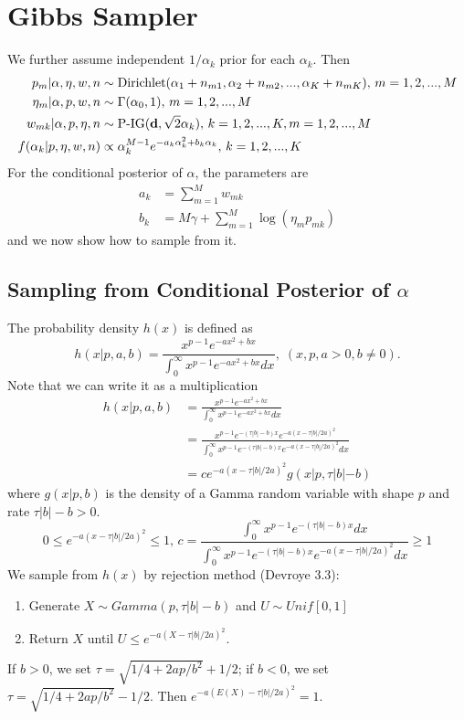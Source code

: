 \documentclass[11pt, oneside]{article}
\begin{document}
\section{Gibbs Sampler}
We further assume independent $1/\alpha_k$ prior for each $\alpha_k$. Then
\begin{align*}
p_m |\alpha, \eta, w, n &\sim  \text{Dirichlet}(\alpha_1+n_{m1}, \alpha_2+n_{m2}, ..., \alpha_K+n_{mK}),\, m=1,2,...,M\\
\eta_m | \alpha, p, w, n &\sim \Gamma(\alpha_0, 1), \, m=1,2,...,M\\
w_{mk} | \alpha, p, \eta, n &\sim \text{P-IG}({\bf d}, \sqrt{2}\alpha_k),\, k=1,2,...,K, m=1,2,...,M\\
f(\alpha_k | p, \eta, w, n) &\propto \alpha_k^{M-1} e^{-a_k\alpha_k^2 + b_k \alpha_k},\, k=1,2,...,K 
\end{align*} 
For the conditional posterior of $\alpha$, the parameters are 
\begin{align*}
a_k &= \sum_{m=1}^M w_{mk}\\
b_k &= M\gamma + \sum_{m=1}^M \log(\eta_m p_{mk})
\end{align*}
and we now show how to sample from it. 

\subsection{Sampling from Conditional Posterior of $\alpha$ }
The probability density $h(x)$ is defined as 
$$
h(x|p,a,b) = \frac{x^{p-1}e^{-ax^2+bx}}{\int_0^\infty x^{p-1}e^{-ax^2+bx}dx},\; (x, p,a >0, b\neq 0).
$$
Note that we can write it as a multiplication 
\begin{align*}
h(x|p,a,b) &=   \frac{x^{p-1}e^{-ax^2+bx}}{\int_0^\infty x^{p-1}e^{-ax^2+bx}dx} \\
&=  \frac{x^{p-1}e^{-(\tau|b|-b)x}e^{-a(x - \tau|b|/2a)^2}}{\int_0^\infty x^{p-1}e^{-(\tau|b|-b)x}e^{-a(x - \tau|b|/2a)^2}dx}\\
& = ce^{-a(x - \tau|b|/2a)^2}g(x|p,\tau|b|-b) 
\end{align*}
where $g(x|p,b)$  is the density of a Gamma random variable with shape $p$ and rate $\tau|b|-b > 0$. $$0\leq e^{-a(x - \tau|b|/2a)^2} \leq 1,\, c =\frac{\int_0^\infty x^{p-1}e^{-(\tau|b|-b)x}dx}{\int_0^\infty x^{p-1}e^{-(\tau|b|-b)x}e^{-a(x - \tau|b|/2a)^2}dx} \geq 1$$
We sample from $h(x)$ by rejection method (Devroye 3.3): 
\begin{enumerate}
\item Generate $X\sim Gamma(p, \tau|b|-b)$ and $U\sim Unif[0,1]$
\item Return $X$ until $U \leq e^{-a(X - \tau|b|/2a)^2}$.
\end{enumerate}
If $b>0$, we set $\tau = \sqrt{1/4 + 2ap/b^2} + 1/2$; if $b<0$, we set $\tau = \sqrt{1/4 + 2ap/b^2} - 1/2$. Then $e^{-a(E(X) - \tau|b|/2a)^2} = 1$.
\end{document}
